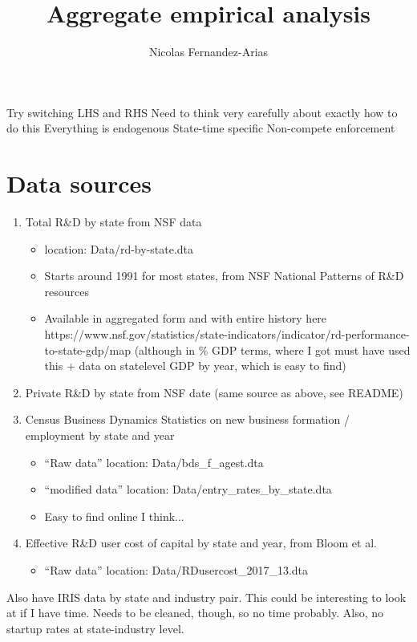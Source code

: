 \documentclass[7pt,english]{article}
\begin{document}
\title{Aggregate empirical analysis}
\author{Nicolas Fernandez-Arias}
\maketitle

Try switching LHS and RHS
Need to think very carefully about exactly how to do this
Everything is endogenous
State-time specific Non-compete enforcement 

\section{Data sources}

\begin{enumerate}
	\item Total R\&D by state from NSF data
	\begin{itemize}
		\item location: Data/rd-by-state.dta
		\item Starts around 1991 for most states, from NSF National Patterns of R\&D resources
		\item Available in aggregated form and with entire history here https://www.nsf.gov/statistics/state-indicators/indicator/rd-performance-to-state-gdp/map (although in \% GDP terms, where I got must have used this + data on statelevel GDP by year, which is easy to find)
	\end{itemize}
	\item Private R\&D by state from NSF date (same source as above, see README)
	\item Census Business Dynamics Statistics on new business formation / employment by state and year
	\begin{itemize}
		\item ``Raw data'' location: Data/bds\_f\_agest.dta
		\item ``modified data'' location: Data/entry\_rates\_by\_state.dta
		\item Easy to find online I think...
	\end{itemize}
	\item Effective R\&D user cost of capital by state and year, from Bloom et al.
	\begin{itemize}
		\item ``Raw data'' location: Data/RDusercost\_2017\_13.dta
	\end{itemize}
\end{enumerate}

Also have IRIS data by state and industry pair. This could be interesting to look at if I have time. Needs to be cleaned, though, so no time probably. Also, no startup rates at state-industry level. 
\end{document}
